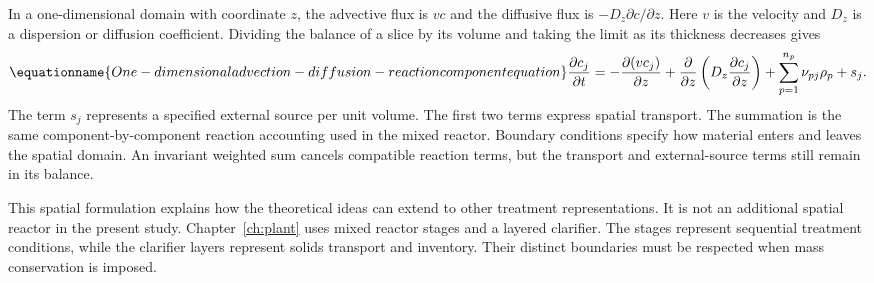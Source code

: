 In a one-dimensional domain with coordinate $z$, the advective flux is $v c$ and the diffusive flux is $-D_z\partial c/\partial z$. Here $v$ is the velocity and $D_z$ is a dispersion or diffusion coefficient. Dividing the balance of a slice by its volume and taking the limit as its thickness decreases gives
\begin{equation}
\equationname{One-dimensional advection-diffusion-reaction component equation}
\frac{\partial c_j}{\partial t}
=-\frac{\partial(v c_j)}{\partial z}
+\frac{\partial}{\partial z}
\left(D_z\frac{\partial c_j}{\partial z}\right)
+\sum_{p=1}^{n_p}\nu_{pj}\rho_p+s_j.
\label{eq:teaching_spatial_balance}
\end{equation}
The term $s_j$ represents a specified external source per unit volume. The first two terms express spatial transport. The summation is the same component-by-component reaction accounting used in the mixed reactor. Boundary conditions specify how material enters and leaves the spatial domain. An invariant weighted sum cancels compatible reaction terms, but the transport and external-source terms still remain in its balance.

This spatial formulation explains how the theoretical ideas can extend to other treatment representations. It is not an additional spatial reactor in the present study. Chapter~\ref{ch:plant} uses mixed reactor stages and a layered clarifier. The stages represent sequential treatment conditions, while the clarifier layers represent solids transport and inventory. Their distinct boundaries must be respected when mass conservation is imposed.
